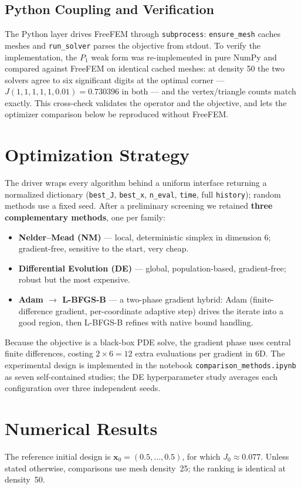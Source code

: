 \documentclass[11pt,a4paper]{article}
\begin{document}
\subsection{Python Coupling and Verification}
The Python layer drives FreeFEM through \texttt{subprocess}: \texttt{ensure\_mesh} caches meshes and
\texttt{run\_solver} parses the objective from stdout. To verify the implementation, the $P_1$ weak
form was re-implemented in pure NumPy and compared against FreeFEM on identical cached meshes: at
density 50 the two solvers agree to six significant digits at the optimal corner ---
$J(1,1,1,1,1,0.01)=0.730396$ in both --- and the vertex/triangle counts match exactly. This
cross-check validates the operator and the objective, and lets the optimizer comparison below be
reproduced without FreeFEM.

\section{Optimization Strategy}
The driver wraps every algorithm behind a uniform interface returning a normalized dictionary
(\texttt{best\_J}, \texttt{best\_x}, \texttt{n\_eval}, \texttt{time}, full \texttt{history}); random
methods use a fixed seed. After a preliminary screening we retained \textbf{three complementary
methods}, one per family:
\begin{itemize}
  \item \textbf{Nelder--Mead (NM)} --- local, deterministic simplex in dimension 6; gradient-free,
  sensitive to the start, very cheap.
  \item \textbf{Differential Evolution (DE)} --- global, population-based, gradient-free; robust but
  the most expensive.
  \item \textbf{Adam $\rightarrow$ L-BFGS-B} --- a two-phase gradient hybrid: Adam (finite-difference
  gradient, per-coordinate adaptive step) drives the iterate into a good region, then L-BFGS-B
  refines with native bound handling.
\end{itemize}
Because the objective is a black-box PDE solve, the gradient phase uses central finite differences,
costing $2\times6=12$ extra evaluations per gradient in 6D. The experimental design is implemented
in the notebook \texttt{comparison\_methods.ipynb} as seven self-contained studies; the DE
hyperparameter study averages each configuration over three independent seeds.

\section{Numerical Results}
The reference initial design is $\mathbf{x}_0=(0.5,\dots,0.5)$, for which $J_0\approx0.077$.
Unless stated otherwise, comparisons use mesh density~25; the ranking is identical at density~50.
\end{document}
